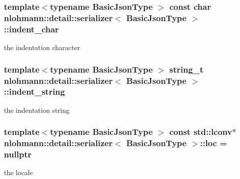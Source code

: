 \subsubsection[{\texorpdfstring{indent\+\_\+char}{indent_char}}]{\setlength{\rightskip}{0pt plus 5cm}template$<$typename Basic\+Json\+Type $>$ const char {\bf nlohmann\+::detail\+::serializer}$<$ Basic\+Json\+Type $>$\+::indent\+\_\+char}\hypertarget{classnlohmann_1_1detail_1_1serializer_a9a55e6b028d09676fe35aefa0c72ea5b}{}\label{classnlohmann_1_1detail_1_1serializer_a9a55e6b028d09676fe35aefa0c72ea5b}


the indentation character 

\subsubsection[{\texorpdfstring{indent\+\_\+string}{indent_string}}]{\setlength{\rightskip}{0pt plus 5cm}template$<$typename Basic\+Json\+Type $>$ {\bf string\+\_\+t} {\bf nlohmann\+::detail\+::serializer}$<$ Basic\+Json\+Type $>$\+::indent\+\_\+string}\hypertarget{classnlohmann_1_1detail_1_1serializer_ae9268a10d88a5526e32735a55a132fc6}{}\label{classnlohmann_1_1detail_1_1serializer_ae9268a10d88a5526e32735a55a132fc6}


the indentation string 

\subsubsection[{\texorpdfstring{loc}{loc}}]{\setlength{\rightskip}{0pt plus 5cm}template$<$typename Basic\+Json\+Type $>$ const std\+::lconv$\ast$ {\bf nlohmann\+::detail\+::serializer}$<$ Basic\+Json\+Type $>$\+::loc = nullptr}\hypertarget{classnlohmann_1_1detail_1_1serializer_a1952945b7652afb59d3903cc8457a589}{}\label{classnlohmann_1_1detail_1_1serializer_a1952945b7652afb59d3903cc8457a589}


the locale 

